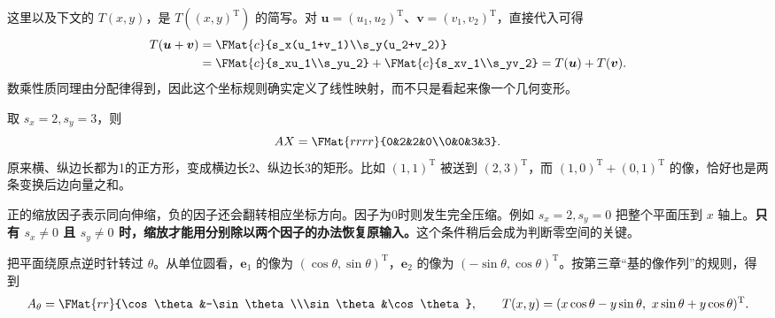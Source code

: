 \documentclass[a4paper,12pt,twoside,openany,fontset=none]{ctexbook}
\numberwithin{equation}{chapter}
\begin{document}
这里以及下文的 $T(x,y)$，是 $T((x,y)^{\mathrm T})$ 的简写。对 $\boldsymbol u=(u_1,u_2)^{\mathrm T}$、$\boldsymbol v=(v_1,v_2)^{\mathrm T}$，直接代入可得
\[
 \begin{aligned}
 T(\boldsymbol u+\boldsymbol v)
 &=\FMat{c}{s_x(u_1+v_1)\\s_y(u_2+v_2)}\\
 &=\FMat{c}{s_xu_1\\s_yu_2}+\FMat{c}{s_xv_1\\s_yv_2}
 =T(\boldsymbol u)+T(\boldsymbol v).
 \end{aligned}
\]
数乘性质同理由分配律得到，因此这个坐标规则确实定义了线性映射，而不只是看起来像一个几何变形。

取 $s_x=2,s_y=3$，则
\[
 AX=\FMat{rrrr}{0&2&2&0\\0&0&3&3}.
\]
原来横、纵边长都为1的正方形，变成横边长2、纵边长3的矩形。比如 $(1,1)^{\mathrm T}$ 被送到 $(2,3)^{\mathrm T}$，而 $(1,0)^{\mathrm T}+(0,1)^{\mathrm T}$ 的像，恰好也是两条变换后边向量之和。

正的缩放因子表示同向伸缩，负的因子还会翻转相应坐标方向。因子为0时则发生完全压缩。例如 $s_x=2,s_y=0$ 把整个平面压到 $x$ 轴上。\textbf{只有 $s_x\ne0$ 且 $s_y\ne0$ 时，缩放才能用分别除以两个因子的办法恢复原输入。}这个条件稍后会成为判断零空间的关键。

把平面绕原点逆时针转过 $\theta$。从单位圆看，$\boldsymbol e_1$ 的像为 $(\cos\theta,\sin\theta)^{\mathrm T}$，$\boldsymbol e_2$ 的像为 $(-\sin\theta,\cos\theta)^{\mathrm T}$。按第三章“基的像作列”的规则，得到
\[
 A_\theta=\FMat{rr}{\cos\theta&-\sin\theta\\\sin\theta&\cos\theta},\qquad
 T(x,y)=(x\cos\theta-y\sin\theta,\ x\sin\theta+y\cos\theta)^{\mathrm T}.
\]
\end{document}
